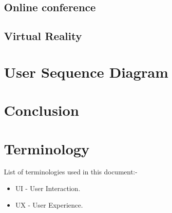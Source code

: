 \documentclass[conference]{IEEEtran}
\begin{document}
      \subsection{Online conference}
         
      \subsection{Virtual Reality}

    \section{User Sequence Diagram}
      
    \section{Conclusion}

    \section{Terminology}
      List of terminologies used in this document:-
      \begin{itemize}
        \item UI - User Interaction.
        \item UX - User Experience.
      \end{itemize}

  \nocite{*}
	\renewcommand\refname{\section{Reference List}}
	\small{
    }
\end{document}
